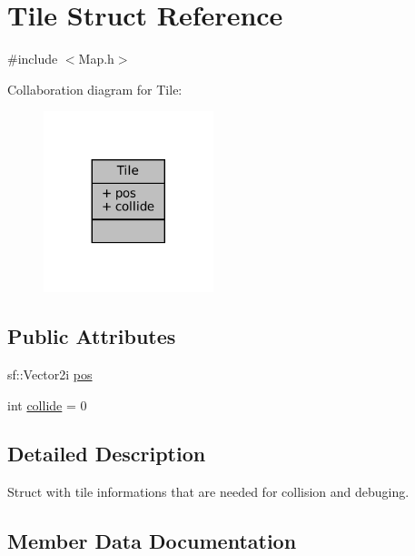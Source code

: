 \hypertarget{structTile}{}\section{Tile Struct Reference}
\label{structTile}


{\ttfamily \#include $<$Map.\+h$>$}



Collaboration diagram for Tile\+:\nopagebreak
\begin{figure}[H]
\begin{center}
\leavevmode
\includegraphics[width=140pt]{structTile__coll__graph}
\end{center}
\end{figure}
\subsection*{Public Attributes}
\begin{DoxyCompactItemize}
\item 
sf\+::\+Vector2i \mbox{\hyperlink{structTile_acf7dda9a45f387cff4fe0ae26ad87340}{pos}}
\item 
int \mbox{\hyperlink{structTile_a94267808f675d1644c0cb33613cc9a7e}{collide}} = 0
\end{DoxyCompactItemize}


\subsection{Detailed Description}
Struct with tile informations that are needed for collision and debuging. 

\subsection{Member Data Documentation}
\mbox{\label{structTile_a94267808f675d1644c0cb33613cc9a7e}} 
